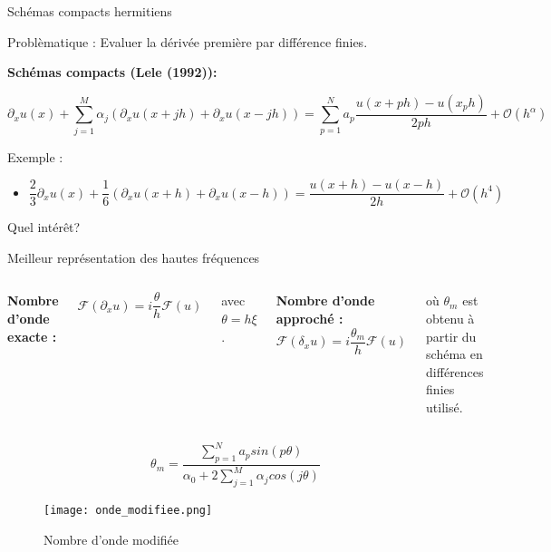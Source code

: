 \documentclass[11pt]{beamer}
\begin{document}
\begin{frame}{Schémas compacts hermitiens}
\begin{exampleblock}{Problèmatique :}
Evaluer la dérivée première par différence finies.
\end{exampleblock}

\pause

\textbf{Schémas compacts (Lele (1992)):}

\small{$$\partial_x u(x) + \sum_{j=1}^M \alpha_j \left( \partial_x u(x+jh)+\partial_x u(x-jh)\right) = \sum_{p=1}^N a_p \dfrac{ u(x+ph) - u(x_ph)}{2ph} +
\mathcal{O}\left( h^{\alpha} \right)$$}

Exemple :
\begin{itemize}
\item $\dfrac{2}{3} \partial_x u(x) + \dfrac{1}{6} \left( \partial_x
  u(x+h) + \partial_x u(x-h) \right) = \dfrac{u(x+h) - u(x-h)}{2h} + \mathcal{O} \left( h^4 \right) $
\end{itemize}

\end{frame}






\begin{frame}
\begin{alertblock}{}
Quel intér\^et?
\end{alertblock}
\pause
\begin{block}{}
Meilleur représentation des hautes fréquences
\end{block}

\begin{columns}
\textbf{Nombre d'onde exacte :}

$$\mathcal{F}\left( \partial_x u \right) = i \dfrac{\theta}{h} \mathcal{F}\left( u \right)$$

avec $\theta = h \xi$.

\textbf{Nombre d'onde approché :}
$$\mathcal{F}\left( \delta_x u \right) = i \dfrac{\theta_m}{h}
\mathcal{F}\left( u \right)$$

où $\theta_m$ est obtenu à partir du schéma en différences finies utilisé.
\end{columns}
\vspace{0.8cm}
\pause
$$\theta_m = \dfrac{\sum_{p=1}^N a_p sin( p \theta )}{\alpha_0 + 2
  \sum_{j=1}^M \alpha_j cos(j \theta)}$$


\end{frame}

\begin{frame}
\begin{figure}
\begin{center}
\texttt{[image: onde\_modifiee.png]}
\caption{Nombre d'onde modifiée}
\end{center}
\end{figure}

\end{frame}
\end{document}
